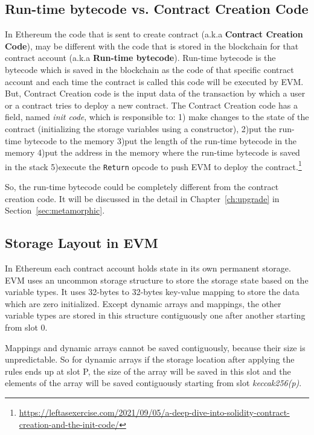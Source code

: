 \subsection{Run-time bytecode vs. Contract Creation Code}
In Ethereum the code that is sent to create contract (a.k.a \textbf{Contract Creation Code}), may be different with the code that is stored in the blockchain for that contract account (a.k.a \textbf{Run-time bytecode}). Run-time bytecode is the bytecode which is saved in the blockchain as the code of that specific contract account and each time the contract is called this code will be executed by EVM. But, Contract Creation code is the input data of the transaction by which a user or a contract tries to deploy a new contract. The Contract Creation code has a field, named \textit{init code}, which is responsible to: 1) make changes to the state of the contract (initializing the storage variables using a constructor), 2)put the run-time bytecode to the memory 3)put the length of the run-time bytecode in the memory 4)put the address in the memory where the run-time bytecode is saved in the stack 5)execute the \texttt{Return} opcode to push EVM to deploy the contract.\footnote{\url{https://leftasexercise.com/2021/09/05/a-deep-dive-into-solidity-contract-creation-and-the-init-code/}} 

So, the run-time bytecode could be completely different from the contract creation code. It will be discussed in the detail in Chapter~\ref{ch:upgrade} in Section~\ref{sec:metamorphic}.

\subsection{Storage Layout in EVM}
In Ethereum each contract account holds state in its own permanent storage. EVM uses an uncommon storage structure to store the storage state based on the variable types. It uses 32-bytes to 32-bytes key-value mapping to store the data which are zero initialized. Except dynamic arrays and mappings, the other variable types are stored in this structure contiguously one after another starting from slot 0. 

Mappings and dynamic arrays cannot be saved contiguously, because their size is unpredictable. So for dynamic arrays if the storage location after applying the rules ends up at slot P, the size of the array will be saved in this slot and the elements of the array will be saved contiguously starting from slot \textit{keccak256(p)}.

